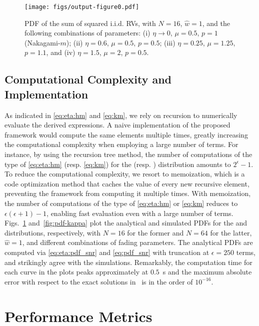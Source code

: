 \documentclass[journal,twocolumn]{IEEEtran}
\begin{document}
\begin{figure}[t]
\centering
\texttt{[image: figs/output-figure0.pdf]}
\caption{\ac{PDF} of the sum of squared \ac{i.i.d.} \Ehm{} \acp{RV}, with $N = 16$, $\hat{w} = 1$, and the following combinations of parameters: (i) $\eta \to 0$, $\mu = 0.5$, $p = 1$ (Nakagami-$m$); (ii) $\eta = 0.6$, $\mu = 0.5$, $p = 0.5$; (iii) $\eta = 0.25$, $\mu = 1.25$, $p = 1.1$, and (iv) $\eta = 1.5$, $\mu =  2$, $p = 0.5$.}
\label{fig:pdf-hm}
\end{figure}


\subsection{Computational Complexity and Implementation}

As indicated in \eqref{eq:eta:hm} and \eqref{eq:km}, we rely on recursion to numerically evaluate the derived expressions. A naive implementation of the proposed framework would compute the same elements multiple times, greatly increasing the computational complexity when employing a large number of terms. For instance, by using the recursion tree method, the number of computations of the type of \eqref{eq:eta:hm} (resp. \eqref{eq:km}) for the \Ehm{} (resp. \km{}) distribution amounts to $2^{\epsilon} - 1$. To reduce the computational complexity, we resort to memoization, which is a code optimization method that caches the value of every new recursive element, preventing the framework from computing it multiple times. With memoization, the number of computations of the type of \eqref{eq:eta:hm} or \eqref{eq:km} reduces to $\epsilon (\epsilon + 1) - 1$, enabling fast evaluation even with a large number of terms. Figs.~\ref{fig:pdf-hm} and~\ref{fig:pdf-kappa} plot the analytical and simulated \acp{PDF} for the \Ehm{} and \km{} distributions, respectively, with $N=16$ for the former and $N=64$ for the latter, $\hat{w} =1$, and different combinations of fading parameters. The analytical \acp{PDF} are computed via \eqref{eq:eta:pdf_snr} and \eqref{eq:pdf_snr} with truncation at $\epsilon = 250$ terms, and strikingly agree with the simulations. Remarkably, the computation time for each curve in the plots peaks approximately at $0.5$~s and the maximum absolute error with respect to the exact solutions in~\cite{Mil08,Bad21} is in the order of $10^{-16}$.


\section{Performance Metrics}\label{sec:metrics}
\end{document}

